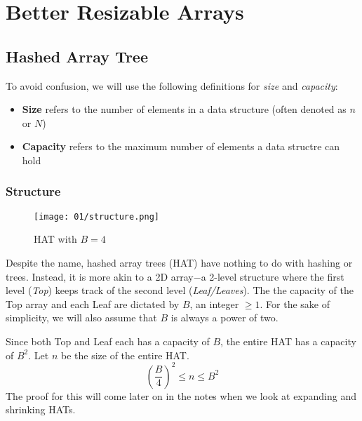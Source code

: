 \chapter{Better Resizable Arrays}

\section{Hashed Array Tree}

\begin{tcolorbox}[title=Terminology]
	To avoid confusion, we will use the following definitions for \textit{size} and \textit{capacity}:
	\begin{itemize}
		\item \textbf{Size} refers to the number of elements in a data structure (often denoted as $n$ or $N$)
		\item \textbf{Capacity} refers to the maximum number of elements a data structre can hold
	\end{itemize}
\end{tcolorbox}

\subsection*{Structure}

\begingroup

\begin{wrapfigure}{l}{0.4\textwidth}
	\centering
	\texttt{[image: 01/structure.png]}
    \caption{HAT with $B=4$}\label{hashed-tree-diagram}
\end{wrapfigure}
Despite the name, hashed array trees (HAT) have nothing to do with hashing or trees. Instead, it is more
akin to a 2D array$-$a 2-level structure where the first level (\textit{Top}) keeps track of the 
second level (\textit{Leaf/Leaves}). The the capacity of the Top array and each Leaf are dictated
by $B$, an integer $\geq1$. For the sake of simplicity, we will also assume that $B$ is always
a power of two.

Since both Top and Leaf each has a capacity of $B$, the entire HAT has a capacity of $B^2$.
Let $n$ be the size of the entire HAT.
\begin{equation}\label{hat-invariant}
	\left(\frac{B}{4}\right)^2 \leq n \leq B^2
\end{equation}
The proof for this will come later on in the notes when we look at expanding and shrinking HATs.

\endgroup

